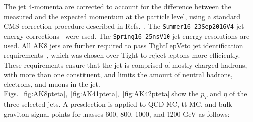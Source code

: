 The jet 4-momenta are corrected to account for the difference between the measured and the expected momentum at the particle level, using a standard CMS correction procedure described in Refs.~\cite{JINST6,CMS-DP-2013-011}. The \texttt{Summer16\_23Sep2016V4} jet energy corrections~\cite{JESUncertaintyTWiki} were used. The \texttt{Spring16\_25nsV10} jet energy resolutions are used.  All AK8 jets are further required to pass TightLepVeto jet identification requirements~\cite{JetID13TeVTWiki}, which was chosen over Tight to reject leptons more efficiently. These requirements ensure that the jet is comprised of mostly charged hadrons, with more than one constituent, and limits the amount of neutral hadrons, electrons, and muons in the jet.
Figs.~\ref{fig:AK8pteta},~\ref{fig:AK41pteta},~\ref{fig:AK42pteta} show the $p_{T}$ and $\eta$ of the three selected jets. A preselection is applied to QCD MC, tt MC, and bulk graviton signal points for masses 600, 800, 1000, and 1200 GeV as follows:
